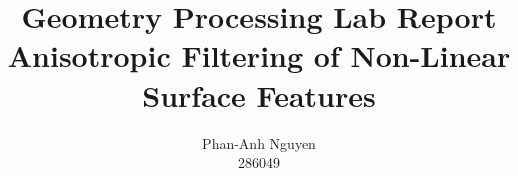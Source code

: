 \documentclass[]{report}
\title{Geometry Processing Lab Report\\
	   Anisotropic Filtering of Non-Linear Surface Features}
\author{Phan-Anh Nguyen\\
		286049}
\begin{document}
\maketitle

\begin{abstract}
\end{abstract}
\end{document}
